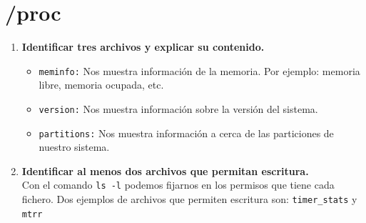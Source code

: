 \documentclass[12pt,letterpaper]{article}
\begin{document}
\section{/proc}
\begin{enumerate}
	\item \textbf{Identificar tres archivos y explicar su contenido.}
	\begin{itemize}
		\item \texttt{meminfo:} Nos muestra información de la memoria. Por ejemplo: memoria libre, memoria ocupada, etc.
		\item \texttt{version:} Nos muestra información sobre la versión del sistema.
		\item \texttt{partitions:} Nos muestra información a cerca de las particiones de nuestro sistema.
	\end{itemize}
	\item \textbf{Identificar al menos dos archivos que permitan escritura.} \\
	Con el comando \texttt{ls -l} podemos fijarnos en los permisos que tiene cada fichero. Dos ejemplos de archivos que permiten escritura son: \texttt{timer\_stats} y \texttt{mtrr}
\end{enumerate}
\end{document}
